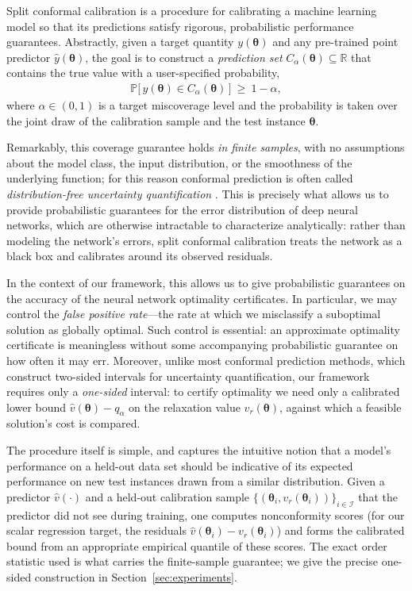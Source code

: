 \documentclass[10pt]{article} %
\theoremstyle{plain}
\theoremstyle{definition}
\theoremstyle{remark}
\begin{document}
Split conformal calibration \citep{vovk2005algorithmic, lei2018distribution} is a procedure for calibrating a machine learning model so that its predictions satisfy rigorous, probabilistic performance guarantees. Abstractly, given a target quantity $y(\bm{\theta})$ and any pre-trained point predictor $\hat{y}(\bm{\theta})$, the goal is to construct a \textit{prediction set} $C_\alpha(\bm{\theta}) \subseteq \mathbb{R}$ that contains the true value with a user-specified probability,
\begin{align*}
    \mathbb{P}\big[\, y(\bm{\theta}) \in C_\alpha(\bm{\theta}) \,\big] ~\geq~ 1 - \alpha,
\end{align*}
where $\alpha \in (0, 1)$ is a target miscoverage level and the probability is taken over the joint draw of the calibration sample and the test instance $\bm{\theta}$.

Remarkably, this coverage guarantee holds \textit{in finite samples}, with no assumptions about the model class, the input distribution, or the smoothness of the underlying function; for this reason conformal prediction is often called \textit{distribution-free uncertainty quantification} \citep{angelopoulos2023conformal}. This is precisely what allows us to provide probabilistic guarantees for the error distribution of deep neural networks, which are otherwise intractable to characterize analytically: rather than modeling the network's errors, split conformal calibration treats the network as a black box and calibrates around its observed residuals.

In the context of our framework, this allows us to give probabilistic guarantees on the accuracy of the neural network optimality certificates. In particular, we may control the \textit{false positive rate}---the rate at which we misclassify a suboptimal solution as globally optimal. Such control is essential: an approximate optimality certificate is meaningless without some accompanying probabilistic guarantee on how often it may err. Moreover, unlike most conformal prediction methods, which construct two-sided intervals for uncertainty quantification, our framework requires only a \textit{one-sided} interval: to certify optimality we need only a calibrated lower bound $\hat{v}(\bm{\theta}) - q_\alpha$ on the relaxation value $v_r(\bm{\theta})$, against which a feasible solution's cost is compared.

The procedure itself is simple, and captures the intuitive notion that a model's performance on a held-out data set should be indicative of its expected performance on new test instances drawn from a similar distribution. Given a predictor $\hat{v}(\cdot)$ and a held-out calibration sample $\{(\bm{\theta}_i, v_r(\bm{\theta}_i))\}_{i \in \mathcal{I}}$ that the predictor did not see during training, one computes nonconformity scores (for our scalar regression target, the residuals $\hat{v}(\bm{\theta}_i) - v_r(\bm{\theta}_i)$) and forms the calibrated bound from an appropriate empirical quantile of these scores. The exact order statistic used is what carries the finite-sample guarantee; we give the precise one-sided construction in Section~\ref{sec:experiments}.
\end{document}
